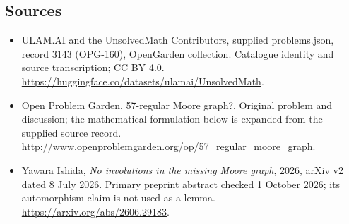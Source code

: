 \documentclass[11pt,a4paper]{article}
\begin{document}
\subsection{Sources}
\begin{itemize}
\item[S1] ULAM.AI and the UnsolvedMath Contributors, supplied problems.json, record 3143 (OPG-160), OpenGarden collection. Catalogue identity and source transcription; CC BY 4.0.
\url{https://huggingface.co/datasets/ulamai/UnsolvedMath}.
\item[S2] Open Problem Garden, 57-regular Moore graph?. Original problem and discussion; the mathematical formulation below is expanded from the supplied source record.
\url{http://www.openproblemgarden.org/op/57_regular_moore_graph}.

\item[R1] Yawara Ishida, \emph{No involutions in the missing Moore graph},
2026, arXiv v2 dated 8 July 2026. Primary preprint abstract checked
1 October 2026; its automorphism claim is not used as a lemma.
\url{https://arxiv.org/abs/2606.29183}.

\end{itemize}
\end{document}
